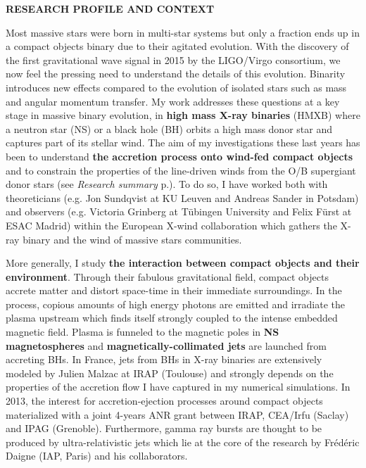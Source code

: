 \documentclass[12pt,onecolumn]{article}
\title{	
\vspace*{-2.5cm}
}
\author{\tiny} %
\date{\tiny }%
\makeatletter
\newcommand*{\hmxb}{HMXB\@\xspace}
\newcommand*{\ns}{NS\@\xspace}
\newcommand*{\bh}{BH\@\xspace}
\newcommand*{\bhs}{BHs\@\xspace}
\newcommand*{\eg}{e.g.\@\xspace}
\makeatother
\begin{document}


\renewcommand{\headrulewidth}{1pt}
\pagestyle{fancy}
\fancyhf{}
\rfoot{\thepage / \pageref{LastPage}}

\vspace*{-1.2cm}
\begin{center}
\Large \textbf{RESEARCH PROFILE AND CONTEXT}\\
\end{center}
\normalfont

Most massive stars were born in multi-star systems but only a fraction ends up in a compact objects binary due to their agitated evolution. With the discovery of the first gravitational wave signal in 2015 by the LIGO/Virgo consortium, we now feel the pressing need to understand the details of this evolution. Binarity introduces new effects compared to the evolution of isolated stars such as mass and angular momentum transfer. My work addresses these questions at a key stage in massive binary evolution, in \textbf{high mass X-ray binaries} (\hmxb) where a neutron star (\ns) or a black hole (\bh) orbits a high mass donor star and captures part of its stellar wind. The aim of my investigations these last years has been to understand \textbf{the accretion process onto wind-fed compact objects} and to constrain the properties of the line-driven winds from the O/B supergiant donor stars (see \textit{Research summary} p.\pageref{sec:summary}). To do so, I have worked both with theoreticians (\eg Jon Sundqvist at KU Leuven and Andreas Sander in Potsdam) and observers (\eg Victoria Grinberg at T\"{u}bingen University and Felix F\"{u}rst at ESAC Madrid) within the European X-wind collaboration which gathers the X-ray binary and the wind of massive stars communities.

More generally, I study \textbf{the interaction between compact objects and their environment}. Through their fabulous gravitational field, compact objects accrete matter and distort space-time in their immediate surroundings. In the process, copious amounts of high energy photons are emitted and irradiate the plasma upstream which finds itself strongly coupled to the intense embedded magnetic field. Plasma is funneled to the magnetic poles in \textbf{\ns magnetospheres} and \textbf{magnetically-collimated jets} are launched from accreting \bhs. In France, jets from \bhs in X-ray binaries are extensively modeled by Julien Malzac at IRAP (Toulouse) and strongly depends on the properties of the accretion flow I have captured in my numerical simulations. In 2013, the interest for accretion-ejection processes around compact objects materialized with a joint 4-years ANR grant between IRAP, CEA/Irfu (Saclay) and IPAG (Grenoble). Furthermore, gamma ray bursts are thought to be produced by ultra-relativistic jets which lie at the core of the research by Fr\'ed\'eric Daigne (IAP, Paris) and his collaborators.
\end{document}
